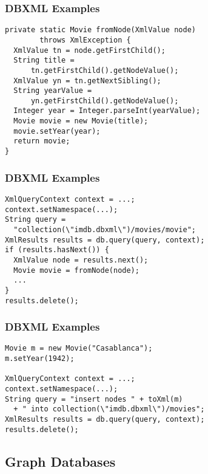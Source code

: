 \documentclass[dvipsnames]{beamer}
\theoremstyle{plain}
\begin{document}
\begin{frame}[fragile]
  \frametitle{DBXML Examples}

  \begin{example}
    \begin{lstlisting}
private static Movie fromNode(XmlValue node)
        throws XmlException {
  XmlValue tn = node.getFirstChild();
  String title =
      tn.getFirstChild().getNodeValue();
  XmlValue yn = tn.getNextSibling();
  String yearValue =
      yn.getFirstChild().getNodeValue();
  Integer year = Integer.parseInt(yearValue);
  Movie movie = new Movie(title);
  movie.setYear(year);
  return movie;
}
    \end{lstlisting}
  \end{example}
\end{frame}

\begin{frame}[fragile]
  \frametitle{DBXML Examples}

  \begin{example}
    \begin{lstlisting}
XmlQueryContext context = ...;
context.setNamespace(...);
String query =
  "collection(\"imdb.dbxml\")/movies/movie";
XmlResults results = db.query(query, context);
if (results.hasNext()) {
  XmlValue node = results.next();
  Movie movie = fromNode(node);
  ...
}
results.delete();
    \end{lstlisting}
  \end{example}
\end{frame}

\begin{frame}[fragile]
  \frametitle{DBXML Examples}

  \begin{example}[insert]
    \begin{lstlisting}
Movie m = new Movie("Casablanca");
m.setYear(1942);

XmlQueryContext context = ...;
context.setNamespace(...);
String query = "insert nodes " + toXml(m)
  + " into collection(\"imdb.dbxml\")/movies";
XmlResults results = db.query(query, context);
results.delete();
    \end{lstlisting}
  \end{example}
\end{frame}

\subsection{Graph Databases}
\end{document}
